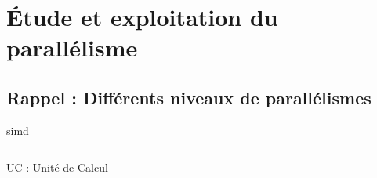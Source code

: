 \documentclass[../main.tex]{subfiles}
\begin{document}
\section{Étude et exploitation du parallélisme}

\subsection{Rappel : Différents niveaux de parallélismes}

\begin{frame}{\acrfull{simd}}
  \begin{columns}
    \begin{column}{.5\linewidth}
      {}
      UC : Unité de Calcul
    \end{column}
  \end{columns}
\end{frame}
\end{document}
